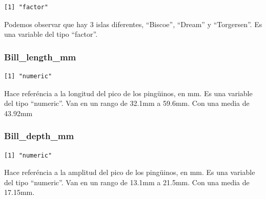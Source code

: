 \documentclass[
  letterpaper,
  DIV=11,
  numbers=noendperiod]{scrartcl}
\newenvironment{Shaded}{\begin{snugshade}}{\end{snugshade}}
\newcommand{\FunctionTok}[1]{\textcolor[rgb]{0.28,0.35,0.67}{#1}}
\newcommand{\NormalTok}[1]{\textcolor[rgb]{0.00,0.23,0.31}{#1}}
\newcommand{\SpecialCharTok}[1]{\textcolor[rgb]{0.37,0.37,0.37}{#1}}
\begin{document}
\begin{Shaded}
\end{Shaded}

\begin{verbatim}
[1] "factor"
\end{verbatim}

Podemos observar que hay 3 islas diferentes, ``Biscoe'', ``Dream'' y
``Torgersen''. Es una variable del tipo ``factor''.

\hypertarget{bill_length_mm}{%
\subsubsection{Bill\_length\_mm}\label{bill_length_mm}}

\begin{Shaded}
\end{Shaded}

\begin{verbatim}
[1] "numeric"
\end{verbatim}

Hace referéncia a la longitud del pico de los pingüinos, en mm. Es una
variable del tipo ``numeric''. Van en un rango de 32.1mm a 59.6mm. Con
una media de 43.92mm

\hypertarget{bill_depth_mm}{%
\subsubsection{Bill\_depth\_mm}\label{bill_depth_mm}}

\begin{Shaded}
\end{Shaded}

\begin{verbatim}
[1] "numeric"
\end{verbatim}

Hace referéncia a la amplitud del pico de los pingüinos, en mm. Es una
variable del tipo ``numeric''. Van en un rango de 13.1mm a 21.5mm. Con
una media de 17.15mm.
\end{document}
